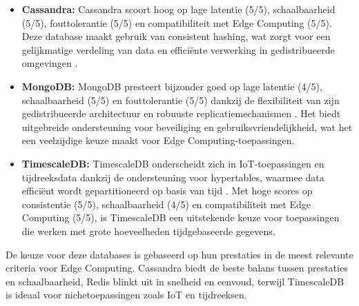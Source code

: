 \begin{itemize}
    \item \textbf{Cassandra:} Cassandra scoort hoog op lage latentie (5/5), schaalbaarheid (5/5), fouttolerantie (5/5) en compatibiliteit met Edge Computing (5/5). Deze database maakt gebruik van consistent hashing, wat zorgt voor een gelijkmatige verdeling van data en efficiënte verwerking in gedistribueerde omgevingen \autocite{CassandraDocumentation}.
    \item \textbf{MongoDB:} MongoDB presteert bijzonder goed op lage latentie (4/5), schaalbaarheid (5/5) en fouttolerantie (5/5) dankzij de flexibiliteit van zijn gedistribueerde architectuur en robuuste replicatiemechanismen \autocite{MongoDBDocumentation}. Het biedt uitgebreide ondersteuning voor beveiliging en gebruiksvriendelijkheid, wat het een veelzijdige keuze maakt voor Edge Computing-toepassingen.
    \item \textbf{TimescaleDB:} TimescaleDB onderscheidt zich in IoT-toepassingen en tijdreeksdata dankzij de ondersteuning voor hypertables, waarmee data efficiënt wordt gepartitioneerd op basis van tijd \autocite{TimescaleDBDocumentation}. Met hoge scores op consistentie (5/5), schaalbaarheid (4/5) en compatibiliteit met Edge Computing (5/5), is TimescaleDB een uitstekende keuze voor toepassingen die werken met grote hoeveelheden tijdgebaseerde gegevens.
\end{itemize}

De keuze voor deze databases is gebaseerd op hun prestaties in de meest relevante criteria voor Edge Computing. Cassandra biedt de beste balans tussen prestaties en schaalbaarheid, Redis blinkt uit in snelheid en eenvoud, terwijl TimescaleDB is ideaal voor nichetoepassingen zoals IoT en tijdreeksen.


